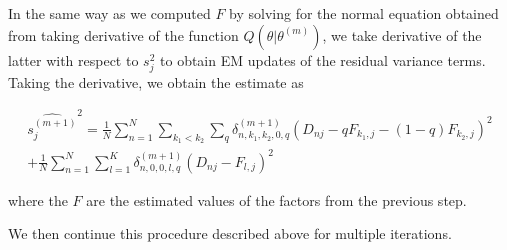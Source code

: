 \documentclass[12pt]{article}
\begin{document}
In the same way as we computed $F$ by solving for the normal equation obtained from taking derivative of the function $Q (\theta | \theta^{(m)})$, we take derivative of the latter with respect to $s^2_{j}$ to obtain EM updates of the residual variance terms. Taking the derivative, we obtain the estimate as 

\begin{multline}
\widehat{s_{j}^{(m+1)}}^2 = \frac{1}{N}\sum_{n=1}^{N} \sum_{k_1 < k_2} \sum_{q} \delta^{(m+1)}_{n, k_1, k_2, 0, q} (D_{nj} - q F_{k_1,j} - (1-q) F_{k_2,j})^2 \\
+  \frac{1}{N}\sum_{n=1}^{N} \sum_{l=1}^{K} \delta^{(m+1)}_{n, 0, 0, l, q} (D_{nj} - F_{l,j} )^2
\end{multline}

where the $F$ are the estimated values of the factors from the previous step.

We then continue this procedure described above for multiple iterations.
\end{document}
